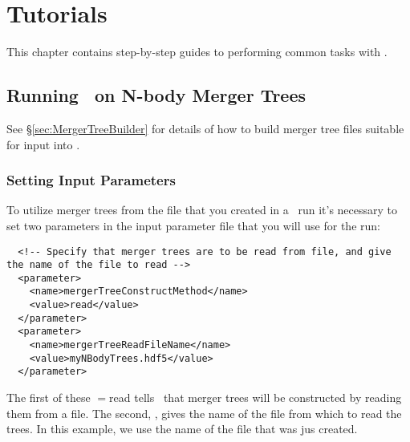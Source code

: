 \chapter{Tutorials}

This chapter contains step-by-step guides to performing common tasks with \glc.

\section{Running \glc\ on N-body Merger Trees}\label{sec:nBodyRun}

See \S\ref{sec:MergerTreeBuilder} for details of how to build merger tree files suitable for input into \glc.

\subsection{Setting Input Parameters}

To utilize merger trees from the file that you created in a \glc\ run it's necessary to set two parameters in the input parameter file that you will use for the run:
\begin{verbatim}
  <!-- Specify that merger trees are to be read from file, and give the name of the file to read -->
  <parameter>
    <name>mergerTreeConstructMethod</name>
    <value>read</value>
  </parameter>
  <parameter>
    <name>mergerTreeReadFileName</name>
    <value>myNBodyTrees.hdf5</value>
  </parameter>
\end{verbatim}
The first of these {\normalfont \ttfamily [mergerTreeConstructMethod]}$=${\normalfont \ttfamily read} tells \glc\ that merger trees will be constructed by reading them from a file. The second, {\normalfont \ttfamily [mergerTreeReadFileName]}, gives the name of the file from which to read the trees. In this example, we use the name of the file that was jus created.

